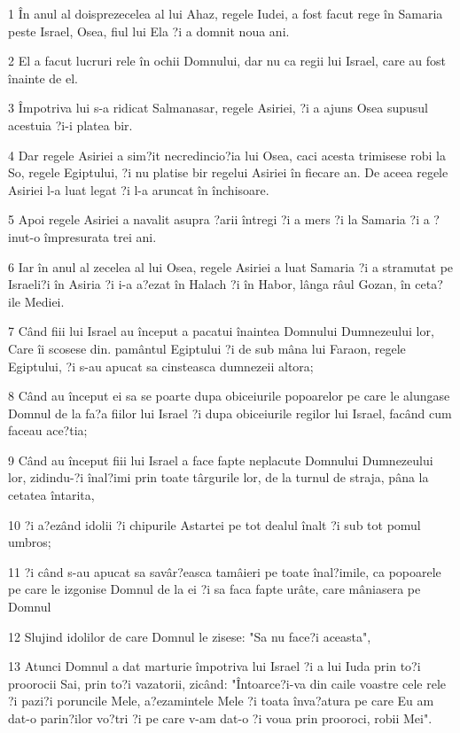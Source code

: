 \par 1 În anul al doisprezecelea al lui Ahaz, regele Iudei, a fost facut rege în Samaria peste Israel, Osea, fiul lui Ela ?i a domnit noua ani.
\par 2 El a facut lucruri rele în ochii Domnului, dar nu ca regii lui Israel, care au fost înainte de el.
\par 3 Împotriva lui s-a ridicat Salmanasar, regele Asiriei, ?i a ajuns Osea supusul acestuia ?i-i platea bir.
\par 4 Dar regele Asiriei a sim?it necredincio?ia lui Osea, caci acesta trimisese robi la So, regele Egiptului, ?i nu platise bir regelui Asiriei în fiecare an. De aceea regele Asiriei l-a luat legat ?i l-a aruncat în închisoare.
\par 5 Apoi regele Asiriei a navalit asupra ?arii întregi ?i a mers ?i la Samaria ?i a ?inut-o împresurata trei ani.
\par 6 Iar în anul al zecelea al lui Osea, regele Asiriei a luat Samaria ?i a stramutat pe Israeli?i în Asiria ?i i-a a?ezat în Halach ?i în Habor, lânga râul Gozan, în ceta?ile Mediei.
\par 7 Când fiii lui Israel au început a pacatui înaintea Domnului Dumnezeului lor, Care îi scosese din. pamântul Egiptului ?i de sub mâna lui Faraon, regele Egiptului, ?i s-au apucat sa cinsteasca dumnezeii altora;
\par 8 Când au început ei sa se poarte dupa obiceiurile popoarelor pe care le alungase Domnul de la fa?a fiilor lui Israel ?i dupa obiceiurile regilor lui Israel, facând cum faceau ace?tia;
\par 9 Când au început fiii lui Israel a face fapte neplacute Domnului Dumnezeului lor, zidindu-?i înal?imi prin toate târgurile lor, de la turnul de straja, pâna la cetatea întarita,
\par 10 ?i a?ezând idolii ?i chipurile Astartei pe tot dealul înalt ?i sub tot pomul umbros;
\par 11 ?i când s-au apucat sa savâr?easca tamâieri pe toate înal?imile, ca popoarele pe care le izgonise Domnul de la ei ?i sa faca fapte urâte, care mâniasera pe Domnul
\par 12 Slujind idolilor de care Domnul le zisese: "Sa nu face?i aceasta",
\par 13 Atunci Domnul a dat marturie împotriva lui Israel ?i a lui Iuda prin to?i proorocii Sai, prin to?i vazatorii, zicând: "Întoarce?i-va din caile voastre cele rele ?i pazi?i poruncile Mele, a?ezamintele Mele ?i toata înva?atura pe care Eu am dat-o parin?ilor vo?tri ?i pe care v-am dat-o ?i voua prin prooroci, robii Mei".
